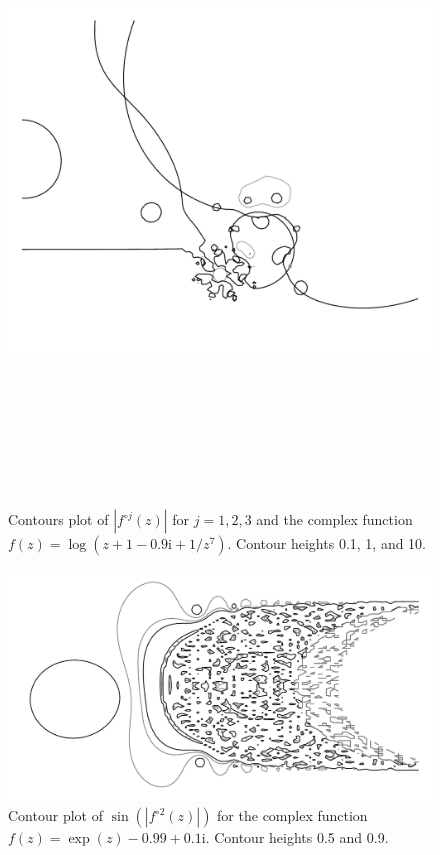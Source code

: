 \documentclass[12pt, a4paper]{amsart}
\newcommand{\mi}{\text{i}}  %
\begin{document}
\begin{figure}[!ht]
\includegraphics[width=160mm, height=170mm]{three_monkeys_eaten.pdf}
\caption{
Contours plot of $|f^{\circ j}(z)|$ for $j = 1, 2, 3$ and the complex function $f(z) = \log(z + 1 -0.9\mi + 1/z^7)$.
Contour heights 0.1, 1, and 10.
}
\end{figure}
\pagebreak
\begin{figure}[!ht] 
\includegraphics[width=230mm, angle=-90]{mr_fancy_pants.pdf}
\caption{
Contour plot of $\sin(|f^{\circ 2}(z)|)$ for the complex function $f(z) = \exp(z) - 0.99 + 0.1\mi$.
Contour heights 0.5 and 0.9.
}
\end{figure}
\end{document}
